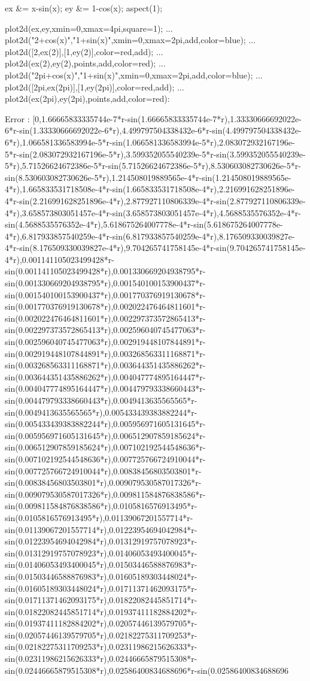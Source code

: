 \documentclass{article}
\begin{document}
\>ex &= x-sin(x); ey &= 1-cos(x); aspect(1);

\>plot2d(ex,ey,xmin=0,xmax=4pi,square=1); ...  
\>     plot2d("2+cos(x)","1+sin(x)",xmin=0,xmax=2pi,\>add,color=blue); ...  
\>     plot2d([2,ex(2)],[1,ey(2)],color=red,\>add); ...  
\>     plot2d(ex(2),ey(2),\>points,\>add,color=red); ...  
\>     plot2d("2pi+cos(x)","1+sin(x)",xmin=0,xmax=2pi,\>add,color=blue); ...  
\>     plot2d([2pi,ex(2pi)],[1,ey(2pi)],color=red,\>add);  ...  
\>     plot2d(ex(2pi),ey(2pi),\>points,\>add,color=red):


    Error : [0,1.66665833335744e-7*r-sin(1.66665833335744e-7*r),1.33330666692022e-6*r-sin(1.33330666692022e-6*r),4.499797504338432e-6*r-sin(4.499797504338432e-6*r),1.066581336583994e-5*r-sin(1.066581336583994e-5*r),2.083072932167196e-5*r-sin(2.083072932167196e-5*r),3.599352055540239e-5*r-sin(3.599352055540239e-5*r),5.71526624672386e-5*r-sin(5.71526624672386e-5*r),8.530603082730626e-5*r-sin(8.530603082730626e-5*r),1.214508019889565e-4*r-sin(1.214508019889565e-4*r),1.665833531718508e-4*r-sin(1.665833531718508e-4*r),2.216991628251896e-4*r-sin(2.216991628251896e-4*r),2.877927110806339e-4*r-sin(2.877927110806339e-4*r),3.658573803051457e-4*r-sin(3.658573803051457e-4*r),4.5688535576352e-4*r-sin(4.5688535576352e-4*r),5.618675264007778e-4*r-sin(5.618675264007778e-4*r),6.817933857540259e-4*r-sin(6.817933857540259e-4*r),8.176509330039827e-4*r-sin(8.176509330039827e-4*r),9.704265741758145e-4*r-sin(9.704265741758145e-4*r),0.001141105023499428*r-sin(0.001141105023499428*r),0.001330669204938795*r-sin(0.001330669204938795*r),0.001540100153900437*r-sin(0.001540100153900437*r),0.001770376919130678*r-sin(0.001770376919130678*r),0.002022476464811601*r-sin(0.002022476464811601*r),0.002297373572865413*r-sin(0.002297373572865413*r),0.002596040745477063*r-sin(0.002596040745477063*r),0.002919448107844891*r-sin(0.002919448107844891*r),0.003268563311168871*r-sin(0.003268563311168871*r),0.003644351435886262*r-sin(0.003644351435886262*r),0.004047774895164447*r-sin(0.004047774895164447*r),0.004479793338660443*r-sin(0.004479793338660443*r),0.0049413635565565*r-sin(0.0049413635565565*r),0.005433439383882244*r-sin(0.005433439383882244*r),0.005956971605131645*r-sin(0.005956971605131645*r),0.006512907859185624*r-sin(0.006512907859185624*r),0.007102192544548636*r-sin(0.007102192544548636*r),0.007725766724910044*r-sin(0.007725766724910044*r),0.00838456803503801*r-sin(0.00838456803503801*r),0.009079530587017326*r-sin(0.009079530587017326*r),0.009811584876838586*r-sin(0.009811584876838586*r),0.0105816576913495*r-sin(0.0105816576913495*r),0.01139067201557714*r-sin(0.01139067201557714*r),0.01223954694042984*r-sin(0.01223954694042984*r),0.01312919757078923*r-sin(0.01312919757078923*r),0.01406053493400045*r-sin(0.01406053493400045*r),0.01503446588876983*r-sin(0.01503446588876983*r),0.01605189303448024*r-sin(0.01605189303448024*r),0.01711371462093175*r-sin(0.01711371462093175*r),0.01822082445851714*r-sin(0.01822082445851714*r),0.01937411182884202*r-sin(0.01937411182884202*r),0.02057446139579705*r-sin(0.02057446139579705*r),0.02182275311709253*r-sin(0.02182275311709253*r),0.02311986215626333*r-sin(0.02311986215626333*r),0.02446665879515308*r-sin(0.02446665879515308*r),0.02586400834688696*r-sin(0.02586400834688696
\end{document}
